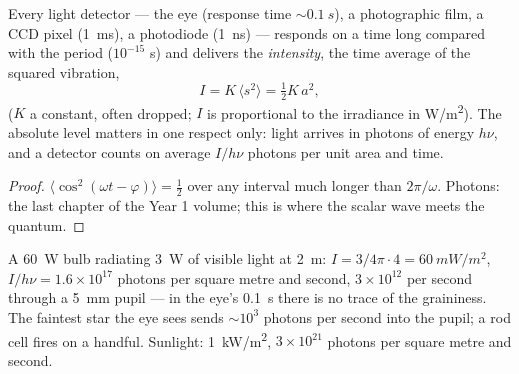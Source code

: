 \begin{proposition}\label{prop:b2:scalar-light-model:intensity}
Every light detector --- the eye (response time $\sim\qty{0.1}{s}$), a
photographic film, a CCD pixel (\qty{1}{ms}), a photodiode (\qty{1}{ns}) ---
responds on a time long compared with the period ($10^{-15}$ s) and
delivers the \emph{intensity}, the time average of the squared
vibration,
\[
I = K\,\langle s^2\rangle = \tfrac12K\,a^2 ,
\]
($K$ a constant, often dropped; $I$ is proportional to the irradiance
in \unit{W/m^2}). The absolute level matters in one respect only: light
arrives in photons of energy $h\nu$, and a detector counts on average
$I/h\nu$ photons per unit area and time.
\end{proposition}

\begin{proof}
$\langle\cos^2(\omega t - \varphi)\rangle = \tfrac12$ over any interval much longer
than $2\pi/\omega$. Photons: the last chapter of the Year 1 volume; this is
where the scalar wave meets the quantum.
\end{proof}

\begin{example}\label{ex:b2:scalar-light-model:orders}
A \qty{60}{W} bulb radiating \qty{3}{W} of visible light at \qty{2}{m}:
$I = 3/4\pi\cdot4 = \qty{60}{mW/m^2}$, $I/h\nu = 1.6 \times 10^{17}$ photons per square
metre and second, $3 \times 10^{12}$ per second through a \qty{5}{mm} pupil ---
in the eye's \qty{0.1}{s} there is no trace of the graininess. The
faintest star the eye sees sends $\sim 10^3$ photons per second into the
pupil; a rod cell fires on a handful. Sunlight: \qty{1}{kW/m^2}, $3 \times 10^{21}$
photons per square metre and second.
\end{example}

